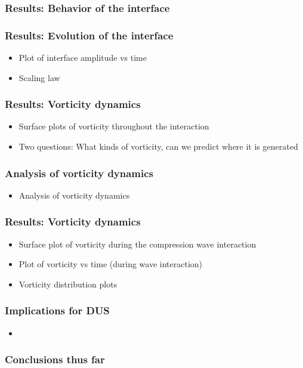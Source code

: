 \begin{frame} \frametitle{Results: Behavior of the interface}
\end{frame}
\begin{frame} \frametitle{Results: Evolution of the interface}
  \begin{itemize}
  \item Plot of interface amplitude vs time
  \item Scaling law
  \end{itemize}
\end{frame}
\begin{frame} \frametitle{Results: Vorticity dynamics}
  \begin{itemize}
  \item Surface plots of vorticity throughout the interaction
  \item Two questions: What kinds of vorticity, can we predict where it is generated
  \end{itemize}
\end{frame}
\begin{frame} \frametitle{Analysis of vorticity dynamics}%
  \begin{itemize}%
  \item Analysis of vorticity dynamics
  \end{itemize}
\end{frame}
\begin{frame} \frametitle{Results: Vorticity dynamics}
  \begin{itemize}
  \item Surface plot of vorticity during the compression wave interaction
  \item Plot of vorticity vs time (during wave interaction)
  \item Vorticity distribution plots
  \end{itemize}
\end{frame}
\begin{frame} \frametitle{Implications for DUS}
  \begin{itemize}
  \item 
  \end{itemize}
\end{frame}
\begin{frame} \frametitle{Conclusions thus far}

\end{frame}

